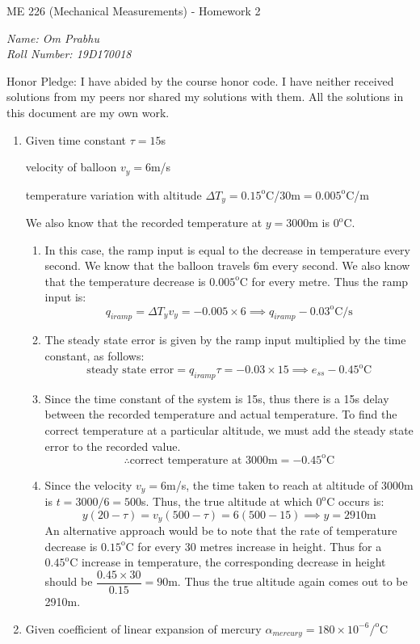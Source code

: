 \documentclass[a4paper, 11pt]{article}
\let\a\alpha
\begin{document}
\begin{center}
	{\Large \sc ME 226 (Mechanical Measurements) - Homework 2}
\end{center}
\textit{Name: Om Prabhu\\
Roll Number: 19D170018}
\vspace{2mm}

Honor Pledge: I have abided by the course honor code. I have neither received solutions from my peers nor shared my solutions with them. All the solutions in this document are my own work.
\vspace{-1.5mm}

\hrulefill
\vspace{2mm}

\begin{enumerate}[label=(\arabic*),leftmargin=*]
	\item Given time constant $\tau=15$s
	
	\hspace{2.85em}velocity of balloon $v_y=6$m/s
	
	\hspace{2.85em}temperature variation with altitude $\Delta T_y=0.15^{\text{o}}$C/30$\text{m}=0.005^{\text{o}}$C/m
	
We also know that the recorded temperature at $y=3000$m is $0^{\text{o}}$C.
\begin{enumerate}
	\item In this case, the ramp input is equal to the decrease in temperature every second. We know that the balloon travels 6m every second. We also know that the temperature decrease is $0.005^{\text{o}}$C for every metre. Thus the ramp input is:
	$$q_{iramp}=\Delta T_yv_y=-0.005\times 6\implies \boxed{q_{iramp}-0.03^{\text{o}}\text{C/s}}$$
	\item The steady state error is given by the ramp input multiplied by the time constant, as follows:
	$$\text{steady state error}=q_{iramp}\tau=-0.03\times 15\implies \boxed{e_{ss}-0.45^{\text{o}}\text{C}}$$
	\item Since the time constant of the system is 15s, thus there is a 15s delay between the recorded temperature and actual temperature. To find the correct temperature at a particular altitude, we must add the steady state error to the recorded value.
	$$\boxed{\therefore\text{correct temperature at 3000m}=-0.45^{\text{o}}\text{C}}$$
	\item Since the velocity $v_y=6$m/s, the time taken to reach at altitude of 3000m is $t=3000/6=500$s. Thus, the true altitude at which $0^{\text{o}}$C occurs is:
	$$y(20-\tau)=v_y(500-\tau)=6(500-15)\implies \boxed{y=2910\text{m}}$$
	An alternative approach would be to note that the rate of temperature decrease is $0.15^{\text{o}}\text{C}$ for every 30 metres increase in height. Thus for a $0.45^{\text{o}}\text{C}$ increase in temperature, the corresponding decrease in height should be $\dfrac{0.45\times 30}{0.15}=90$m. Thus the true altitude again comes out to be 2910m.
\end{enumerate}
\newpage
	\item Given coefficient of linear expansion of mercury $\a_{mercury}=180\times 10^{-6}/^{\text{o}}$C
	

\end{enumerate}
\end{document}
